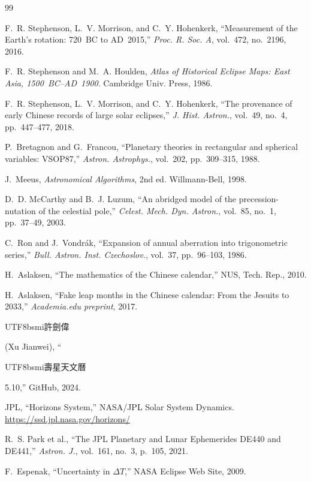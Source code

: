\documentclass[10pt,a4paper]{article}
\newcommand{\zh}[1]{\begin{CJK}{UTF8}{bsmi}#1\end{CJK}}
\begin{document}
\begin{sloppypar}
\begin{thebibliography}{99}

F.~R. Stephenson, L.~V. Morrison, and C.~Y. Hohenkerk,
``Measurement of the Earth's rotation: 720~BC to AD~2015,''
\textit{Proc. R. Soc. A}, vol.~472, no.~2196, 2016.

F.~R. Stephenson and M.~A. Houlden,
\textit{Atlas of Historical Eclipse Maps: East Asia, 1500~BC--AD~1900}.
Cambridge Univ. Press, 1986.

F.~R. Stephenson, L.~V. Morrison, and C.~Y. Hohenkerk,
``The provenance of early Chinese records of large solar eclipses,''
\textit{J. Hist. Astron.}, vol.~49, no.~4, pp.~447--477, 2018.

P.~Bretagnon and G.~Francou,
``Planetary theories in rectangular and spherical variables: VSOP87,''
\textit{Astron. Astrophys.}, vol.~202, pp.~309--315, 1988.

J.~Meeus,
\textit{Astronomical Algorithms}, 2nd ed.
Willmann-Bell, 1998.

D.~D. McCarthy and B.~J. Luzum,
``An abridged model of the precession-nutation of the celestial pole,''
\textit{Celest. Mech. Dyn. Astron.}, vol.~85, no.~1, pp.~37--49, 2003.

C.~Ron and J.~Vondr\'{a}k,
``Expansion of annual aberration into trigonometric series,''
\textit{Bull. Astron. Inst. Czechoslov.}, vol.~37, pp.~96--103, 1986.

H.~Aslaksen,
``The mathematics of the Chinese calendar,''
NUS, Tech. Rep., 2010.

H.~Aslaksen,
``Fake leap months in the Chinese calendar: From the Jesuits to 2033,''
\textit{Academia.edu preprint}, 2017.

\zh{許劍偉} (Xu Jianwei),
``\zh{壽星天文曆} 5.10,''
GitHub, 2024.

JPL, ``Horizons System,'' NASA/JPL Solar System Dynamics.
\url{https://ssd.jpl.nasa.gov/horizons/}

R.~S. Park et al.,
``The JPL Planetary and Lunar Ephemerides DE440 and DE441,''
\textit{Astron. J.}, vol.~161, no.~3, p.~105, 2021.

F.~Espenak, ``Uncertainty in $\Delta T$,'' NASA Eclipse Web Site, 2009.


\end{thebibliography}
\end{sloppypar}
\end{document}
